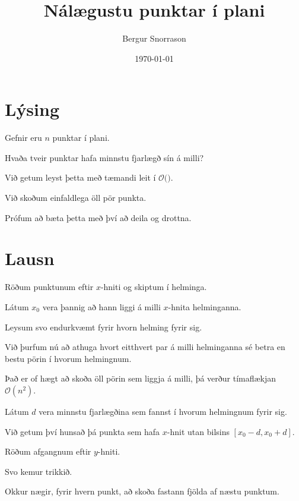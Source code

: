 \title{Nálægustu punktar í plani}
\author{Bergur Snorrason}
\date{\today}



\frame{\titlepage}

\section{Lýsing}
{
    {
        \item<1-> Gefnir eru $n$ punktar í plani.
        \item<2-> Hvaða tveir punktar hafa minnstu fjarlægð sín á milli?
        \item<3-> Við getum leyst þetta með tæmandi leit í $\mathcal{O}($$)$.
        \item<5-> Við skoðum einfaldlega öll pör punkta.
        \item<6-> Prófum að bæta þetta með því að deila og drottna.
    }
}

\section{Lausn}
{
    {
        \item<1-> Röðum punktunum eftir $x$-hniti og skiptum í helminga.
        \item<2-> Látum $x_0$ vera þannig að hann liggi á milli $x$-hnita helminganna.
        \item<3-> Leysum svo endurkvæmt fyrir hvorn helming fyrir sig.
        \item<4-> Við þurfum nú að athuga hvort eitthvert par á milli helminganna sé betra en
                    bestu pörin í hvorum helmingnum.
        \item<5-> Það er of hægt að skoða öll pörin sem liggja á milli, þá verður tímaflækjan $\mathcal{O}(n^2)$.
        \item<6-> Látum $d$ vera minnstu fjarlægðina sem fannst í hvorum helmingnum fyrir sig.
        \item<7-> Við getum því hunsað þá punkta sem hafa $x$-hnit utan bilsins $[x_0 - d, x_0 + d]$.
        \item<8-> Röðum afgangnum eftir $y$-hniti.
        \item<9-> Svo kemur trikkið.
        \item<10-> Okkur nægir, fyrir hvern punkt, að skoða fastann fjölda af næstu punktum.
    }
}

